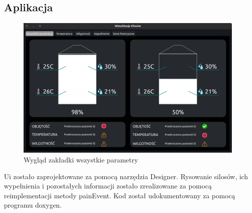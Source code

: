     \subsection{Aplikacja}
        \begin{figure}[H]
            \centering
            \includegraphics[width = \textwidth]{obrazy/zakladka_wszystkie_parametry.png}
            \caption{Wygląd zakładki wszystkie parametry}
        \end{figure}

        Ui zostało zaprojektowane za pomocą narzędzia Designer. Rysowanie silosów, ich wypełnienia i pozostałych 
        informacji zostało zrealizowane za pomocą reimplementacji metody painEvent. 
        Kod został udokumentowany za pomocą programu doxygen.